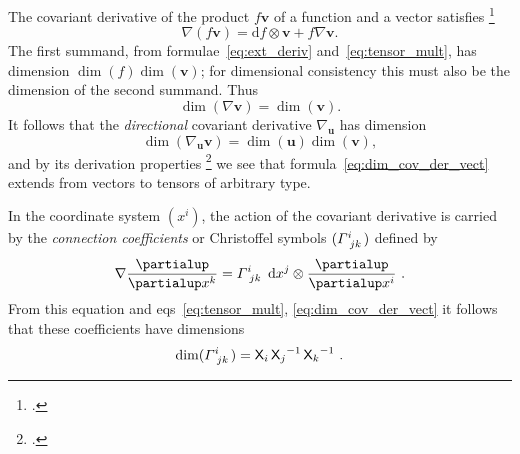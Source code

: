 \documentclass[\ifafour a4paper,12pt,\else a5paper,10pt,\fi%
onecolumn,oneside,article,%
british%
]{memoir}
\theoremstyle{remark}
\theoremstyle{innote}
\newcommand*{\citep}{\footcites}
\newcommand*{\de}{\partialup}%
\newcommand*{\di}{\mathrm{d}}%
\renewcommand*{\|}[1][]{\nonscript\,#1\vert\nonscript\;\mathopen{}}
\newcommand*{\sect}{\S}%
\newcommand*{\eqns}{eqs}%
\newcommand*{\Xx}{\textsf{X}}
\newcommand*{\yv}{\bm{v}}
\newcommand*{\yu}{\bm{u}}
\renewcommand*{\i}{\indices}
\newcommand*{\dex}[1][i]{\frac{\de}{\de x^{#1}}}
\newcommand*{\dix}[1][i]{\di x^{#1}}
\newcommand*{\nab}{\nabla}
\newcommand*{\yGa}{\varGamma}
\begin{document}
The covariant derivative of the product $f\yv$ of a function and a vector
satisfies \citep[\sect~V.B.1]{choquetbruhatetal1977_r1996}
\begin{equation}
  \label{eq:basic_property_covder}
  \nab(f\yv) = \di f \otimes \yv + f\nab\yv.
\end{equation}
The first summand, from formulae~\eqref{eq:ext_deriv}
and~\eqref{eq:tensor_mult}, has dimension $\dim(f)\dim(\yv)$; for
dimensional consistency this must also be the dimension of the second
summand. Thus
\begin{equation}
  \label{eq:dim_cov_der_vect}
  \dim(\nab\yv) = \dim(\yv).
\end{equation}
It follows that the \emph{directional} covariant derivative $\nab_{\yu}$
has dimension
\begin{equation}
  \label{eq:dim_dircov_der_vect}
  \dim(\nab_{\yu}\yv) = \dim(\yu)\dim(\yv),
\end{equation}
and by its derivation properties \citep[\sect~V.B.1
p.~303]{choquetbruhatetal1977_r1996} we see that
formula~\eqref{eq:dim_cov_der_vect} extends from vectors to 
tensors of arbitrary type.

\medskip

In the coordinate system $(x^{i})$, the action of the covariant derivative
is carried by the \emph{connection coefficients} or Christoffel symbols
$(\yGa\i{^{i}_{jk}})$ defined by
\begin{equation}
  \label{eq:christoffel}
  \nab\dex[k] = \yGa\i{^{i}_{jk}}\  \dix[j]\otimes\dex[i]\ .
\end{equation}
From this equation and \eqns~\eqref{eq:tensor_mult},
\eqref{eq:dim_cov_der_vect} it follows that these coefficients have
dimensions
\begin{equation}
  \label{eq:dim_christoffel}
  \dim(\yGa\i{^{i}_{jk}}) = \Xx_{i}\, {\Xx_{j}}^{-1}\,{\Xx_{k}}^{-1}\ .
\end{equation}

\medskip
\end{document}
